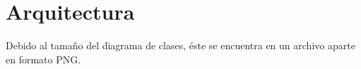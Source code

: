 \section{Arquitectura}

Debido al tamaño del diagrama de clases, éste se encuentra en un archivo aparte
en formato PNG.

